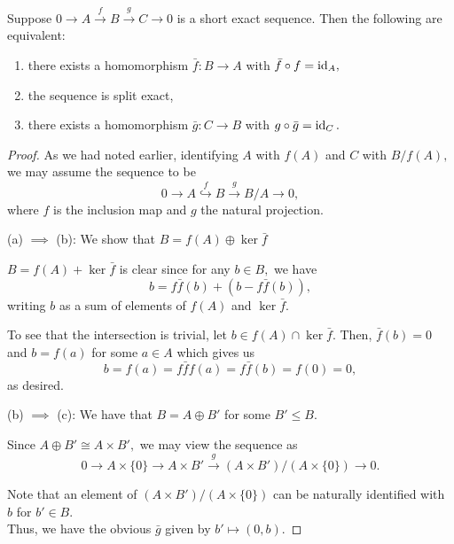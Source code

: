 \documentclass[12pt]{article}
\begin{document}
\begin{prop} \label{prop:splitsequences}
 	Suppose $0 \to A \overset{f}{\longrightarrow} B \overset{g}{\longrightarrow} C \to 0$ is a short exact sequence. Then the following are equivalent:
 	\begin{enumerate}[label = (\alph*)]
 		\item there exists a homomorphism $\bar{f}:B \to A$ with $\bar{f}\circ f = \operatorname{id}_A,$
 		\item the sequence is split exact,
 		\item there exists a homomorphism $\bar{g}:C \to B$ with $g \circ \bar{g} = \operatorname{id}_C.$
 	\end{enumerate}
\end{prop} 
\begin{proof} 
	As we had noted earlier, identifying $A$ with $f(A)$ and $C$ with $B/f(A),$ we may assume the sequence to be
	\begin{equation*} 
		0 \to A \overset{f}{\hookrightarrow} B \overset{g}{\longrightarrow} B/A \to 0,
	\end{equation*}
	where $f$ is the inclusion map and $g$ the natural projection.

	(a) $\implies$ (b): We show that $B = f(A) \oplus \ker \bar{f}$

	$B = f(A) + \ker \bar{f}$ is clear since for any $b \in B,$ we have
	\begin{equation*} 
		b = f\bar{f}(b) + (b - f\bar{f}(b)),
	\end{equation*}
	writing $b$ as a sum of elements of $f(A)$ and $\ker \bar{f}.$

	To see that the intersection is trivial, let $b \in f(A) \cap \ker \bar{f}.$ Then, $\bar{f}(b) = 0$ and $b = f(a)$ for some $a \in A$ which gives us
	\begin{equation*} 
		b = f(a) = f\bar{f}f(a) = f\bar{f}(b) = f(0) = 0,
	\end{equation*}
	as desired.

	(b) $\implies$ (c): We have that $B = A \oplus B'$ for some $B' \le B.$

	Since $A \oplus B' \cong A \times B',$ we may view the sequence as
	\begin{equation*} 
		0 \to A \times \{0\} \to A\times B' \overset{g}{\longrightarrow} (A \times B')/(A \times \{0\}) \to 0.
	\end{equation*}

	Note that an element of $(A \times B')/(A \times \{0\})$ can be naturally identified with $b$ for $b' \in B.$ \\
	Thus, we have the obvious $\bar{g}$ given by $b' \mapsto (0, b).$


\end{proof}
\end{document}
